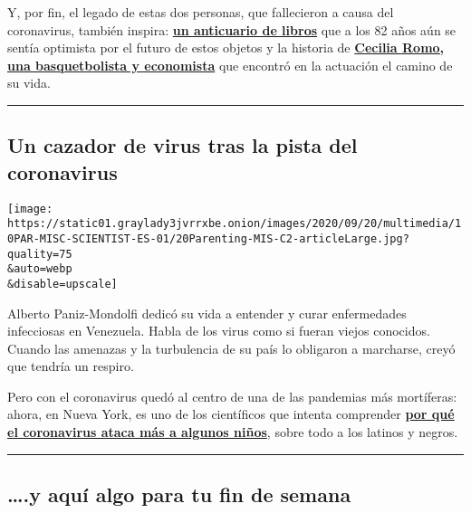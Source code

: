 Y, por fin, el legado de estas dos personas, que fallecieron a causa del
coronavirus, también inspira:
\textbf{\href{https://www.nytimes3xbfgragh.onion/es/2020/08/27/espanol/cultura/Alfredo-Breitfeld-librero.html}{un
anticuario de libros}} que a los 82 años aún se sentía optimista por el
futuro de estos objetos y la historia de
\textbf{\href{https://www.nytimes3xbfgragh.onion/es/2020/09/10/espanol/cultura/cecilia-romo-coronavirus.html}{Cecilia
Romo, una basquetbolista y economista}} que encontró en la actuación el
camino de su vida.

\begin{center}\rule{0.5\linewidth}{\linethickness}\end{center}

\hypertarget{un-cazador-de-virus-tras-la-pista-del-coronavirus}{%
\subsection{Un cazador de virus tras la pista del
coronavirus}\label{un-cazador-de-virus-tras-la-pista-del-coronavirus}}

\texttt{[image: https://static01.graylady3jvrrxbe.onion/images/2020/09/20/multimedia/10PAR-MISC-SCIENTIST-ES-01/20Parenting-MIS-C2-articleLarge.jpg?quality=75\\\&auto=webp\\\&disable=upscale]}

Alberto Paniz-Mondolfi dedicó su vida a entender y curar enfermedades
infecciosas en Venezuela. Habla de los virus como si fueran viejos
conocidos. Cuando las amenazas y la turbulencia de su país lo obligaron
a marcharse, creyó que tendría un respiro.

Pero con el coronavirus quedó al centro de una de las pandemias más
mortíferas: ahora, en Nueva York, es uno de los científicos que intenta
comprender
\textbf{\href{https://www.nytimes3xbfgragh.onion/es/2020/09/10/espanol/ciencia-y-tecnologia/Alberto-Paniz-Mondolf-coronavirus-ninos.html}{por
qué el coronavirus ataca más a algunos niños}}, sobre todo a los latinos
y negros.

\begin{center}\rule{0.5\linewidth}{\linethickness}\end{center}

\hypertarget{y-aquuxed-algo-para-tu-fin-de-semana}{%
\subsection{\ldots{}.y aquí algo para tu fin de
semana}\label{y-aquuxed-algo-para-tu-fin-de-semana}}


